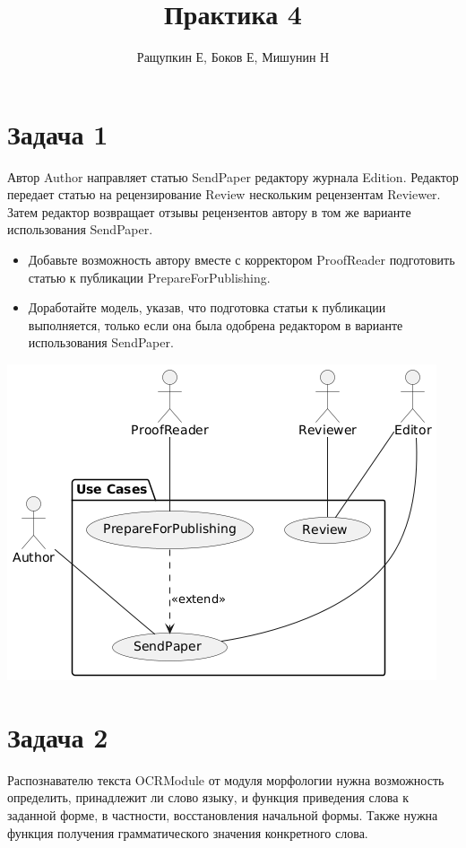 \documentclass{article}
\begin{document}
\title{Практика 4}
\author{Ращупкин Е, Боков Е, Мишунин Н}
\maketitle

\section{Задача 1}
Автор Author направляет статью SendPaper редактору журнала Edition. Редактор передает статью на рецензирование Review нескольким рецензентам Reviewer. Затем редактор возвращает отзывы рецензентов автору в том же варианте использования SendPaper.

\begin{itemize}
    \item Добавьте возможность автору вместе с корректором ProofReader подготовить статью  к публикации PrepareForPublishing.
    \item Доработайте модель, указав, что подготовка статьи к публикации выполняется, только если она была одобрена редактором в варианте использования SendPaper.
\end{itemize}

\includegraphics[width=\textwidth]{1.png}

\section{Задача 2}
Распознавателю текста OCRModule от модуля морфологии нужна возможность определить, принадлежит ли слово языку, и функция приведения слова к заданной форме, в частности, восстановления начальной формы. Также нужна функция получения грамматического значения конкретного слова.
\end{document}
